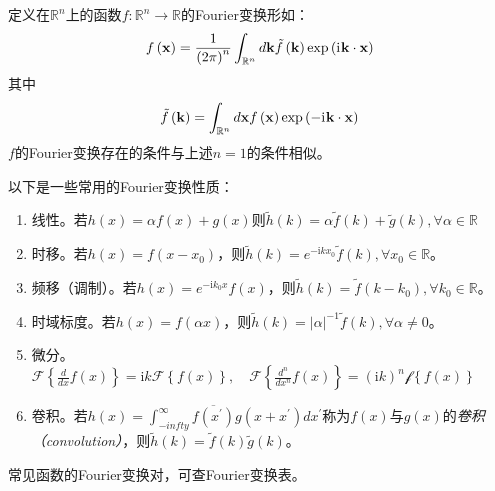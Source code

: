 \documentclass[main.tex]{subfiles}
\begin{document}
定义在$\mathbb{R}^n$上的函数$f:\mathbb{R}^n\rightarrow\mathbb{R}$的Fourier变换形如：
\begin{equation}\label{eq:fourier_transform_2}
    f\left(\mathbf{x}\right)=\frac{1}{\left(2\pi\right)^n}\int_{\mathbb{R}^n}d\mathbf{k}\tilde{f}\left(\mathbf{k}\right)\exp\left(\mathrm{i}\mkern1mu \mathbf{k}\cdot\mathbf{x}\right)
\end{equation}
其中
\[\tilde{f}\left(\mathbf{k}\right)=\int_{\mathbb{R}^n}d\mathbf{x}f\left(\mathbf{x}\right)\exp\left(-\mathrm{i}\mkern1mu\mathbf{k}\cdot\mathbf{x}\right)\]
$f$的Fourier变换存在的条件与上述$n=1$的条件相似。

以下是一些常用的Fourier变换性质：
\begin{enumerate}
    \item 线性。若$h\left(x\right)=\alpha f\left(x\right)+g\left(x\right)$则$\tilde{h}\left(k\right)=\alpha\tilde{f}\left(k\right)+\tilde{g}\left(k\right),\forall \alpha\in\mathbb{R}$
    \item 时移。若$h\left(x\right)=f\left(x-x_0\right)$，则$\tilde{h}\left(k\right)=e^{-\mathrm{i}kx_0}\tilde{f}\left(k\right),\forall x_0\in\mathbb{R}$。
    \item 频移（调制）。若$h\left(x\right)=e^{-\mathrm{i}k_0x}f\left(x\right)$，则$\tilde{h}\left(k\right)=\tilde{f}\left(k-k_0\right),\forall k_0\in\mathbb{R}$。
    \item 时域标度。若$h\left(x\right)=f\left(\alpha x\right)$，则$\tilde{h}\left(k\right)=\left|\alpha\right|^{-1}\tilde{f}\left(k\right),\forall \alpha\neq 0$。
    \item 微分。$\mathcal{F}\left\{\frac{d}{dx}f\left(x\right)\right\}=\mathrm{i}k\mathcal{F}\left\{f\left(x\right)\right\},\quad\mathcal{F}\left\{\frac{d^n}{dx^n}f\left(x\right)\right\}=\left(\mathrm{i}k\right)^n\mathcal{f}\left\{f\left(x\right)\right\}$
    \item 卷积。若$h\left(x\right)=\int_{-infty}^\infty\overline{f\left(x^\prime\right)}g\left(x+x^\prime\right)dx^\prime$称为$f\left(x\right)$与$g\left(x\right)$的\emph{卷积（convolution）}，则$\tilde{h}\left(k\right)=\tilde{f}\left(k\right)\tilde{g}\left(k\right)$。
\end{enumerate}

常见函数的Fourier变换对，可查Fourier变换表。

\end{document}
